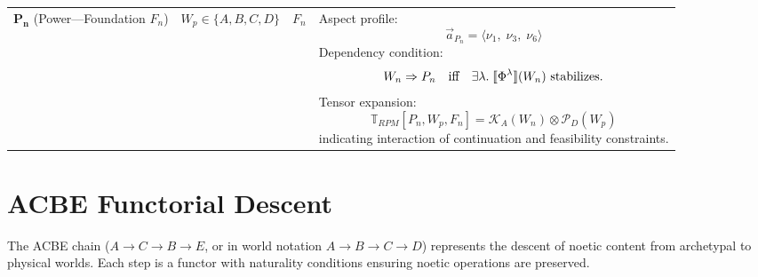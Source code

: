 \begin{longtable}{p{2.2cm}|p{2cm}|p{1.8cm}|p{5cm}}
\midrule

$\mathbf{P_n}$ (Power---Foundation $F_n$)
& $W_p \in \{A,B,C,D\}$
& $F_n$
& Aspect profile:
\[
\vec{a}_{P_n} =
\langle
\nu_1,\;
\nu_3,\;
\nu_6
\rangle
\]
Dependency condition:
\[
W_n \Rightarrow P_n
\quad\text{iff}\quad
\exists \lambda.\;
\llbracket \Phi^{\lambda} \rrbracket(W_n)
\text{ stabilizes.}
\]
Tensor expansion:
\[
\mathbb{T}_{RPM}[P_n, W_p, F_n] =
\mathcal{K}_A(W_n) \otimes \mathcal{P}_D(W_p)
\]
indicating interaction of continuation and feasibility constraints.
\\

\end{longtable}

\section{ACBE Functorial Descent}

The ACBE chain ($A \to C \to B \to E$, or in world notation $A \to B \to C \to D$)
represents the descent of noetic content from archetypal to physical worlds.
Each step is a functor with naturality conditions ensuring noetic operations
are preserved.

